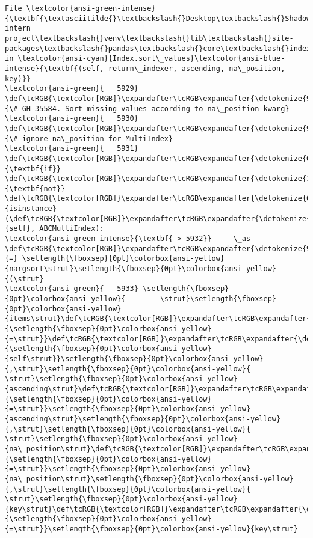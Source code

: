 \documentclass[11pt]{article}
\begin{document}
\begin{Verbatim}[commandchars=\\\{\}, frame=single, framerule=2mm, rulecolor=\color{outerrorbackground}]
File \textcolor{ansi-green-intense}{\textbf{\textasciitilde{}\textbackslash{}Desktop\textbackslash{}Shadowfox intern project\textbackslash{}venv\textbackslash{}lib\textbackslash{}site-packages\textbackslash{}pandas\textbackslash{}core\textbackslash{}indexes\textbackslash{}base.py:5932}}, in \textcolor{ansi-cyan}{Index.sort\_values}\textcolor{ansi-blue-intense}{\textbf{(self, return\_indexer, ascending, na\_position, key)}}
\textcolor{ansi-green}{   5929} \def\tcRGB{\textcolor[RGB]}\expandafter\tcRGB\expandafter{\detokenize{95,135,135}}{\# GH 35584. Sort missing values according to na\_position kwarg}
\textcolor{ansi-green}{   5930} \def\tcRGB{\textcolor[RGB]}\expandafter\tcRGB\expandafter{\detokenize{95,135,135}}{\# ignore na\_position for MultiIndex}
\textcolor{ansi-green}{   5931} \def\tcRGB{\textcolor[RGB]}\expandafter\tcRGB\expandafter{\detokenize{0,135,0}}{\textbf{if}} \def\tcRGB{\textcolor[RGB]}\expandafter\tcRGB\expandafter{\detokenize{175,0,255}}{\textbf{not}} \def\tcRGB{\textcolor[RGB]}\expandafter\tcRGB\expandafter{\detokenize{0,135,0}}{isinstance}(\def\tcRGB{\textcolor[RGB]}\expandafter\tcRGB\expandafter{\detokenize{0,135,0}}{self}, ABCMultiIndex):
\textcolor{ansi-green-intense}{\textbf{-> 5932}}     \_as \def\tcRGB{\textcolor[RGB]}\expandafter\tcRGB\expandafter{\detokenize{98,98,98}}{=} \setlength{\fboxsep}{0pt}\colorbox{ansi-yellow}{nargsort\strut}\setlength{\fboxsep}{0pt}\colorbox{ansi-yellow}{(\strut}
\textcolor{ansi-green}{   5933} \setlength{\fboxsep}{0pt}\colorbox{ansi-yellow}{        \strut}\setlength{\fboxsep}{0pt}\colorbox{ansi-yellow}{items\strut}\def\tcRGB{\textcolor[RGB]}\expandafter\tcRGB\expandafter{\detokenize{98,98,98}}{\setlength{\fboxsep}{0pt}\colorbox{ansi-yellow}{=\strut}}\def\tcRGB{\textcolor[RGB]}\expandafter\tcRGB\expandafter{\detokenize{0,135,0}}{\setlength{\fboxsep}{0pt}\colorbox{ansi-yellow}{self\strut}}\setlength{\fboxsep}{0pt}\colorbox{ansi-yellow}{,\strut}\setlength{\fboxsep}{0pt}\colorbox{ansi-yellow}{ \strut}\setlength{\fboxsep}{0pt}\colorbox{ansi-yellow}{ascending\strut}\def\tcRGB{\textcolor[RGB]}\expandafter\tcRGB\expandafter{\detokenize{98,98,98}}{\setlength{\fboxsep}{0pt}\colorbox{ansi-yellow}{=\strut}}\setlength{\fboxsep}{0pt}\colorbox{ansi-yellow}{ascending\strut}\setlength{\fboxsep}{0pt}\colorbox{ansi-yellow}{,\strut}\setlength{\fboxsep}{0pt}\colorbox{ansi-yellow}{ \strut}\setlength{\fboxsep}{0pt}\colorbox{ansi-yellow}{na\_position\strut}\def\tcRGB{\textcolor[RGB]}\expandafter\tcRGB\expandafter{\detokenize{98,98,98}}{\setlength{\fboxsep}{0pt}\colorbox{ansi-yellow}{=\strut}}\setlength{\fboxsep}{0pt}\colorbox{ansi-yellow}{na\_position\strut}\setlength{\fboxsep}{0pt}\colorbox{ansi-yellow}{,\strut}\setlength{\fboxsep}{0pt}\colorbox{ansi-yellow}{ \strut}\setlength{\fboxsep}{0pt}\colorbox{ansi-yellow}{key\strut}\def\tcRGB{\textcolor[RGB]}\expandafter\tcRGB\expandafter{\detokenize{98,98,98}}{\setlength{\fboxsep}{0pt}\colorbox{ansi-yellow}{=\strut}}\setlength{\fboxsep}{0pt}\colorbox{ansi-yellow}{key\strut}

\end{Verbatim}
\end{document}
